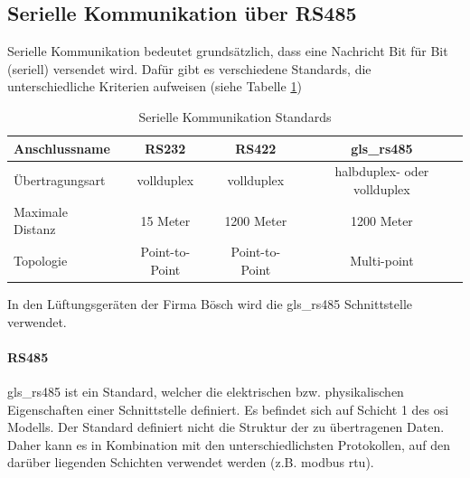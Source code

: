 \subsection{Serielle Kommunikation über RS485}
Serielle Kommunikation bedeutet grundsätzlich, dass eine Nachricht Bit für Bit (seriell) versendet wird. \cite[vgl.][]{Schnabel:o.J.} Dafür gibt es verschiedene Standards, die unterschiedliche Kriterien aufweisen (siehe Tabelle \ref{tab:serielle}) 
\begin{table}[H]
	\caption{Serielle Kommunikation Standards \label{tab:serielle}}
	\begin{tabularx}{\textwidth}{@{}X|c|c|c@{}}
		\toprule
		\textbf{Anschlussname} & \textbf{RS232} & \textbf{RS422} & \textbf{\gls{gls_rs485}}\\
		\midrule
		Übertragungsart & \gls{vollduplex} & \gls{vollduplex} & \gls{halbduplex}- oder \gls{vollduplex} \\
		Maximale Distanz & 15 Meter & 1200 Meter & 1200 Meter \\
		Topologie & Point-to-Point & Point-to-Point & Multi-point \\
		\bottomrule
	\end{tabularx}
\end{table}
\cite[vgl.][]{IPC2U_GmbH_SerielleSchnittstellen:o.J.}

In den Lüftungsgeräten der Firma Bösch wird die \gls{gls_rs485} Schnittstelle verwendet.

\paragraph{RS485} \label{rs485}
\gls{gls_rs485} ist ein Standard, welcher die elektrischen bzw. physikalischen Eigenschaften einer Schnittstelle definiert. Es befindet sich auf Schicht 1 des \gls{osi} Modells. Der Standard definiert nicht die Struktur der zu übertragenen Daten. Daher kann es in Kombination mit den unterschiedlichsten Protokollen, auf den darüber liegenden Schichten verwendet werden (z.B. \gls{modbus} \acs{rtu}). \cite[vgl.][]{Janitza:o.J.}


